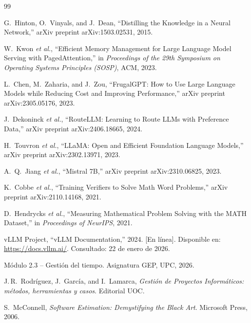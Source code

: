 \documentclass[11pt,a4paper]{article}
\begin{document}
\begin{thebibliography}{99}

G.~Hinton, O.~Vinyals, and J.~Dean, ``Distilling the Knowledge in a Neural Network,'' arXiv preprint arXiv:1503.02531, 2015.

W.~Kwon \textit{et al.}, ``Efficient Memory Management for Large Language Model Serving with PagedAttention,'' in \textit{Proceedings of the 29th Symposium on Operating Systems Principles (SOSP)}, ACM, 2023.

L.~Chen, M.~Zaharia, and J.~Zou, ``FrugalGPT: How to Use Large Language Models while Reducing Cost and Improving Performance,'' arXiv preprint arXiv:2305.05176, 2023.

J.~Dekoninck \textit{et al.}, ``RouteLLM: Learning to Route LLMs with Preference Data,'' arXiv preprint arXiv:2406.18665, 2024.

H.~Touvron \textit{et al.}, ``LLaMA: Open and Efficient Foundation Language Models,'' arXiv preprint arXiv:2302.13971, 2023.

A.~Q.~Jiang \textit{et al.}, ``Mistral 7B,'' arXiv preprint arXiv:2310.06825, 2023.

K.~Cobbe \textit{et al.}, ``Training Verifiers to Solve Math Word Problems,'' arXiv preprint arXiv:2110.14168, 2021.

D.~Hendrycks \textit{et al.}, ``Measuring Mathematical Problem Solving with the MATH Dataset,'' in \textit{Proceedings of NeurIPS}, 2021.

vLLM Project, ``vLLM Documentation,'' 2024. [En línea]. Disponible en: \url{https://docs.vllm.ai/}. Consultado: 22 de enero de 2026.

Módulo 2.3 -- Gestión del tiempo. Asignatura GEP, UPC, 2026.

J.\,R.~Rodríguez, J.~García, and I.~Lamarca, \textit{Gestión de Proyectos Informáticos: métodos, herramientas y casos}. Editorial UOC.

S.~McConnell, \textit{Software Estimation: Demystifying the Black Art}. Microsoft Press, 2006.


\end{thebibliography}
\end{document}
